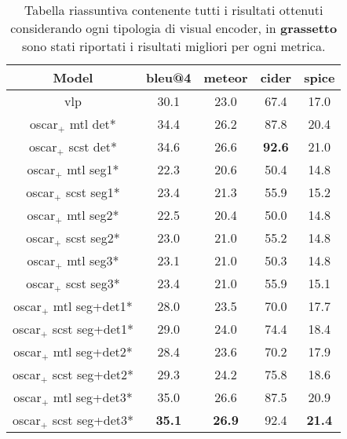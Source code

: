 \begin{table}[h]
\footnotesize
\begin{center}
\begin{tabular}{||c c c c c||} 
 \hline
 \textbf{Model} & \textbf{\acrshort{bleu}@4} & \textbf{\acrshort{meteor}} & \textbf{\acrshort{cider}} & \textbf{\acrshort{spice}}\\ [0.5ex] 
 \hline\hline
 \acrshort{vlp} \cite{zhou2020unified} & 30.1 & 23.0 & 67.4 & 17.0\\
 \hline
 \acrshort{oscar}$_+$ \acrshort{mtl} det* & 34.4 & 26.2 & 87.8 & 20.4\\
 \hline
 \acrshort{oscar}$_+$ \acrshort{scst} det* & 34.6 & 26.6 & \textbf{92.6} & 21.0\\
 \hline
 \acrshort{oscar}$_+$ \acrshort{mtl} seg1* & 22.3 & 20.6 & 50.4 & 14.8\\
 \hline
 \acrshort{oscar}$_+$ \acrshort{scst} seg1* & 23.4 & 21.3 & 55.9 & 15.2\\
 \hline
 \acrshort{oscar}$_+$ \acrshort{mtl} seg2* & 22.5 & 20.4 & 50.0 & 14.8\\
 \hline
 \acrshort{oscar}$_+$ \acrshort{scst} seg2* & 23.0 & 21.0 & 55.2 & 14.8\\
 \hline
 \acrshort{oscar}$_+$ \acrshort{mtl} seg3* & 23.1 & 21.0 & 50.3 & 14.8\\
 \hline
 \acrshort{oscar}$_+$ \acrshort{scst} seg3* & 23.4 & 21.0 & 55.9 & 15.1\\
 \hline
 \acrshort{oscar}$_+$ \acrshort{mtl} seg+det1* & 28.0 & 23.5 & 70.0 & 17.7\\
 \hline
 \acrshort{oscar}$_+$ \acrshort{scst} seg+det1* & 29.0 & 24.0 & 74.4 & 18.4\\
 \hline
 \acrshort{oscar}$_+$ \acrshort{mtl} seg+det2* & 28.4 & 23.6 & 70.2 & 17.9\\
 \hline
 \acrshort{oscar}$_+$ \acrshort{scst} seg+det2* & 29.3 & 24.2 & 75.8 & 18.6\\
 \hline
 \acrshort{oscar}$_+$ \acrshort{mtl} seg+det3* & 35.0 & 26.6 & 87.5 & 20.9\\
 \hline
 \acrshort{oscar}$_+$ \acrshort{scst} seg+det3* & \textbf{35.1} & \textbf{26.9} & 92.4 & \textbf{21.4}\\
 \hline
\end{tabular}
\caption{Tabella riassuntiva contenente tutti i risultati ottenuti considerando ogni tipologia di visual encoder, in \textbf{grassetto} sono stati riportati i risultati migliori per ogni metrica.}
\label{table:6}
\end{center}
\end{table}


